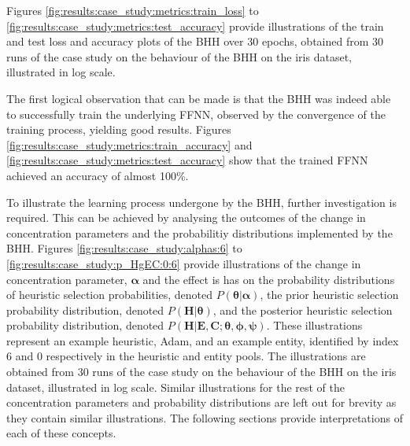 Figures \ref{fig:results:case_study:metrics:train_loss} to \ref{fig:results:case_study:metrics:test_accuracy} provide illustrations of the train and test loss and accuracy plots of the \acs{BHH} over 30 epochs, obtained from 30 runs of the case study on the behaviour of the \acs{BHH} on the iris dataset, illustrated in log scale.

The first logical observation that can be made is that the \acs{BHH} was indeed able to successfully train the underlying \acs{FFNN}, observed by the convergence of the training process, yielding good results. Figures \ref{fig:results:case_study:metrics:train_accuracy} and \ref{fig:results:case_study:metrics:test_accuracy} show that the trained \acs{FFNN} achieved an accuracy of almost 100\%.

To illustrate the learning process undergone by the \acs{BHH}, further investigation is required. This can be achieved by analysing the outcomes of the change in concentration parameters and the probabilitiy distributions implemented by the \acs{BHH}. Figures \ref{fig:results:case_study:alphas:6} to \ref{fig:results:case_study:p_HgEC:0:6} provide illustrations of the change in concentration parameter, $\boldsymbol{\alpha}$ and the effect is has on the probability distributions of heuristic selection probabilities, denoted $P(\boldsymbol{\theta} \vert \boldsymbol{\alpha})$, the prior heuristic selection probability distribution, denoted $P(\boldsymbol{H} \vert \boldsymbol{\theta})$, and the posterior heuristic selection probability distribution, denoted $P(\boldsymbol{H} \vert \boldsymbol{E}, \boldsymbol{C}; \boldsymbol{\theta}, \boldsymbol{\phi}, \boldsymbol{\psi})$. These illustrations represent an example heuristic, \acs{Adam}, and an example entity, identified by index 6 and 0 respectively in the heuristic and entity pools. The illustrations are obtained from 30 runs of the case study on the behaviour of the \acs{BHH} on the iris dataset, illustrated in log scale. Similar illustrations for the rest of the concentration parameters and probability distributions are left out for brevity as they contain similar illustrations. The following sections provide interpretations of each of these concepts.

